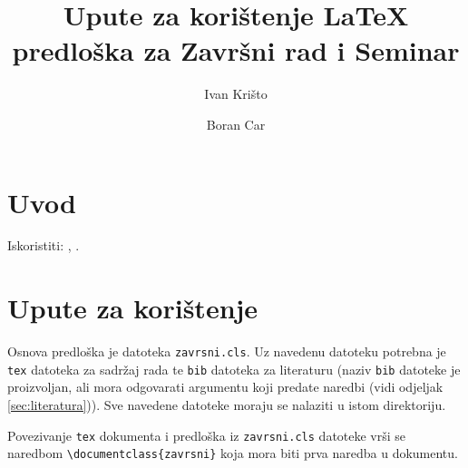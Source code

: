 \documentclass{zavrsni}
\begin{document}
\title{Upute za korištenje \LaTeX{} predloška za Završni rad i Seminar}
\author{Ivan Krišto \and Boran Car}

\maketitle

\tableofcontents

\chapter{Uvod}

Iskoristiti: \citep{taraborelli2009beauty}, \citep{cottrell1999word}.

\chapter{Upute za korištenje}
Osnova predloška je datoteka \texttt{zavrsni.cls}. Uz navedenu datoteku potrebna
je \texttt{tex} datoteka za sadržaj rada te \texttt{bib} datoteka za literaturu
(naziv \texttt{bib} datoteke je proizvoljan, ali mora odgovarati argumentu koji
predate naredbi \verb|| (vidi odjeljak \ref{sec:literatura})). Sve
navedene datoteke moraju se nalaziti u istom direktoriju.

Povezivanje \texttt{tex} dokumenta i predloška iz \texttt{zavrsni.cls}
datoteke vrši se naredbom \verb|\documentclass{zavrsni}| koja mora biti prva
naredba u dokumentu.
\end{document}
